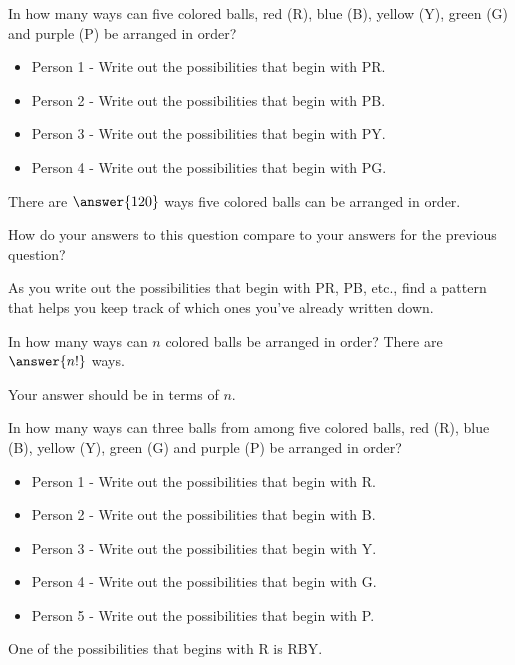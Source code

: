 \documentclass[number]{ximera}
\begin{document}
\begin{question}
In how many ways can five colored balls, red (R), blue (B), yellow (Y), green (G) and purple (P) be arranged in order?
\begin{itemize}
\item Person 1 - Write out the possibilities that begin with PR.
\item Person 2 - Write out the possibilities that begin with PB.
\item Person 3 - Write out the possibilities that begin with PY.
\item Person 4 - Write out the possibilities that begin with PG.
\end{itemize}
There are $\answer{120}$ ways five colored balls can be arranged in order.
\begin{hint}
How do your answers to this question compare to your answers for the previous question?
\end{hint}
\begin{hint}
As you write out the possibilities that begin with PR, PB, etc., find a pattern that helps you keep track of which ones you've already written down.
\end{hint}
\end{question}

\begin{question}
In how many ways can $n$ colored balls be arranged in order? There are $\answer{n!}$ ways.
\begin{hint}
Your answer should be in terms of $n$.
\end{hint}
\end{question}

\begin{question}
In how many ways can three balls from among five colored balls, red (R), blue (B), yellow (Y), green (G) and purple (P) be arranged in order?
\begin{itemize}
\item Person 1 - Write out the possibilities that begin with R.
\item Person 2 - Write out the possibilities that begin with B.
\item Person 3 - Write out the possibilities that begin with Y.
\item Person 4 - Write out the possibilities that begin with G.
\item Person 5 - Write out the possibilities that begin with P.
\end{itemize}
\begin{hint}
One of the possibilities that begins with R is RBY.
\end{hint}
\end{question}
\end{document}
